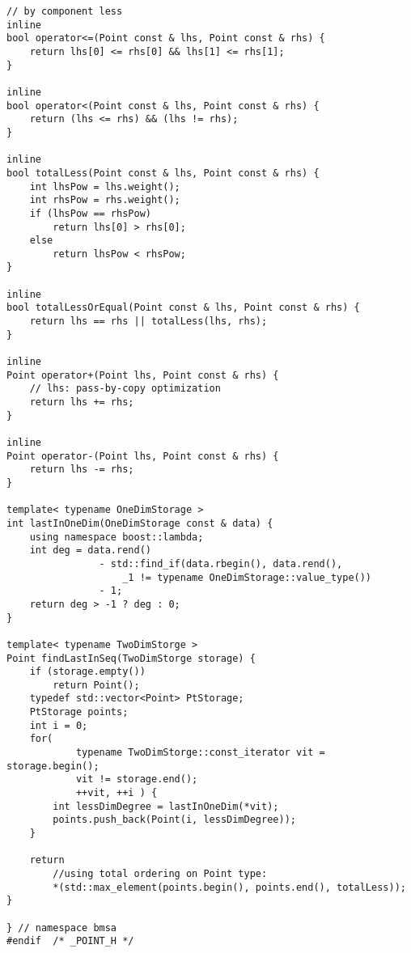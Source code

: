 \begin{lstlisting}
// by component less
inline
bool operator<=(Point const & lhs, Point const & rhs) {
    return lhs[0] <= rhs[0] && lhs[1] <= rhs[1];
}

inline
bool operator<(Point const & lhs, Point const & rhs) {
    return (lhs <= rhs) && (lhs != rhs);
}

inline
bool totalLess(Point const & lhs, Point const & rhs) {
    int lhsPow = lhs.weight();
    int rhsPow = rhs.weight();
    if (lhsPow == rhsPow)
        return lhs[0] > rhs[0];
    else
        return lhsPow < rhsPow;
}

inline
bool totalLessOrEqual(Point const & lhs, Point const & rhs) {
    return lhs == rhs || totalLess(lhs, rhs);
}

inline
Point operator+(Point lhs, Point const & rhs) {
    // lhs: pass-by-copy optimization
    return lhs += rhs;
}

inline
Point operator-(Point lhs, Point const & rhs) {
    return lhs -= rhs;
}

template< typename OneDimStorage >
int lastInOneDim(OneDimStorage const & data) {
    using namespace boost::lambda;
    int deg = data.rend()
                - std::find_if(data.rbegin(), data.rend(),
                    _1 != typename OneDimStorage::value_type())
                - 1;
    return deg > -1 ? deg : 0;
}

template< typename TwoDimStorge >
Point findLastInSeq(TwoDimStorge storage) {
    if (storage.empty())
        return Point();
    typedef std::vector<Point> PtStorage;
    PtStorage points;
    int i = 0;
    for(
            typename TwoDimStorge::const_iterator vit = storage.begin();
            vit != storage.end();
            ++vit, ++i ) {
        int lessDimDegree = lastInOneDim(*vit);
        points.push_back(Point(i, lessDimDegree));
    }

    return
        //using total ordering on Point type:
        *(std::max_element(points.begin(), points.end(), totalLess));
}

} // namespace bmsa
#endif	/* _POINT_H */
\end{lstlisting}

